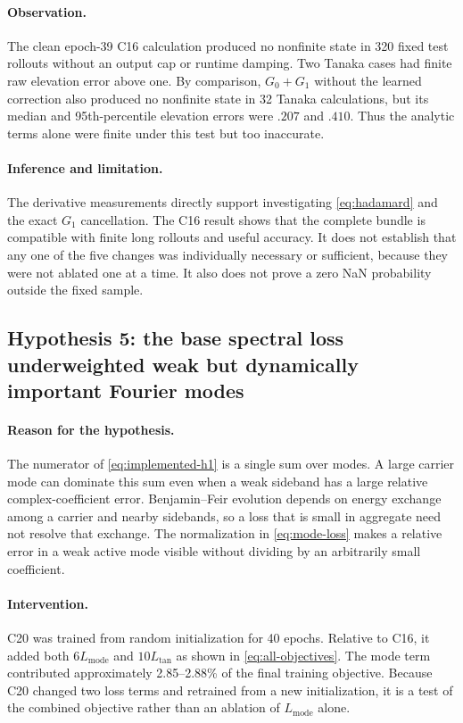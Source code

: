 \documentclass[11pt]{article}
\begin{document}
\paragraph{Observation.}
The clean epoch-39 C16 calculation produced no nonfinite state in 320 fixed
test rollouts without an output cap or runtime damping.  Two Tanaka cases had
finite raw elevation error above one.  By comparison, $G_0+G_1$ without the
learned correction also produced no nonfinite state in 32 Tanaka calculations,
but its median and 95th-percentile elevation errors were $.207$ and $.410$.
Thus the analytic terms alone were finite under this test but too inaccurate.

\paragraph{Inference and limitation.}
The derivative measurements directly support investigating
\eqref{eq:hadamard} and the exact $G_1$ cancellation.  The C16 result shows
that the complete bundle is compatible with finite long rollouts and useful
accuracy.  It does not establish that any one of the five changes was
individually necessary or sufficient, because they were not ablated one at a
time.  It also does not prove a zero NaN probability outside the fixed sample.


\subsection{Hypothesis 5: the base spectral loss underweighted weak but
dynamically important Fourier modes}

\paragraph{Reason for the hypothesis.}
The numerator of \eqref{eq:implemented-h1} is a single sum over modes.  A
large carrier mode can dominate this sum even when a weak sideband has a large
relative complex-coefficient error.  Benjamin--Feir evolution depends on
energy exchange among a carrier and nearby sidebands, so a loss that is small
in aggregate need not resolve that exchange.  The normalization in
\eqref{eq:mode-loss} makes a relative error in a weak active mode visible
without dividing by an arbitrarily small coefficient.

\paragraph{Intervention.}
C20 was trained from random initialization for 40 epochs.  Relative to C16,
it added both $6L_{\mathrm{mode}}$ and $10L_{\mathrm{tan}}$ as shown in
\eqref{eq:all-objectives}.  The mode term contributed approximately
2.85--2.88\% of the final training objective.  Because C20 changed two loss
terms and retrained from a new initialization, it is a test of the combined
objective rather than an ablation of $L_{\mathrm{mode}}$ alone.
\end{document}
